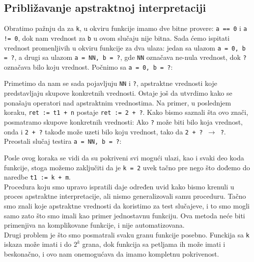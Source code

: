\subsection{Približavanje apstraktnoj interpretaciji}
\label{subsec:approachingabsint}
Obratimo pažnju da za \texttt{k}, u okviru funkcije imamo dve bitne provere:
\texttt{a == 0} i \texttt{a != 0}, dok nam vrednost za \texttt{b} u ovom slučaju
nije bitna. Sada ćemo ispitati vrednost promenljivih u okviru funkcije za dva ulaza:
jedan sa ulazom \texttt{a = 0, b = ?}, a drugi sa ulazom \texttt{a = NN, b = ?},
gde \texttt{NN} označava ne-nula vrednost, dok \texttt{?} označava bilo koju vrednost.
Počnimo sa \texttt{a = 0, b = ?}:

Primetimo da nam se sada pojavljuju \texttt{NN} i \texttt{?}, apstraktne vrednosti
koje predstavljaju skupove konkretnih vrednosti.
Ostaje još da utvrdimo kako se ponašaju operatori nad apstraktnim vrednostima.
Na primer, u poslednjem koraku, \texttt{ret := t1 + n} postaje \texttt{ret := 2 + ?}.
Kako bismo saznali šta ovo znači, posmatramo skupove konkretnih vrednosti: Ako \texttt{?}
može biti bilo koja vrednost, onda i \texttt{2 + ?} takođe može uzeti bilo koju vrednost,
tako da \texttt{2 + ? $\longrightarrow$ ?}. Preostali slučaj testira \texttt{a = NN, b = ?}:

Posle ovog koraka se vidi da su pokriveni svi mogući ulazi, kao i svaki deo koda
funkcije, stoga možemo zaključiti da je \texttt{k = 2} uvek tačno pre nego što
dođemo do naredbe \texttt{t1 := k + m}. \\
Procedura koju smo upravo ispratili daje određen uvid kako bismo krenuli u proces
apstraktne interpretacije, ali nismo generalizovali samu proceduru. Tačno smo
znali koje apstraktne vrednosti da koristimo za test slučajeve, i to smo mogli
samo zato što smo imali kao primer jednostavnu funkciju. Ova metoda neće biti
primenjiva na komplikovane funkcije, i nije automatizovana.\\
Drugi problem je što smo posmatrali svaku granu funkcije posebno. Funckija sa \texttt{k} iskaza može imati i do
\texttt{$2^k$} grana, dok funkcija sa petljama ih može imati i beskonačno, i ovo nam onemogućava da imamo kompletnu
pokrivenost.

